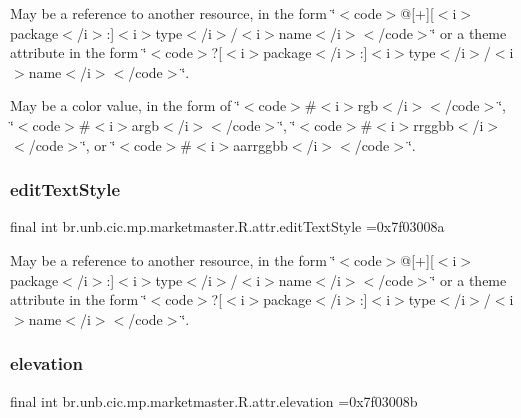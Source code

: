 May be a reference to another resource, in the form \char`\"{}$<$code$>$@\mbox{[}+\mbox{]}\mbox{[}$<$i$>$package$<$/i$>$\+:\mbox{]}$<$i$>$type$<$/i$>$/$<$i$>$name$<$/i$>$$<$/code$>$\char`\"{} or a theme attribute in the form \char`\"{}$<$code$>$?\mbox{[}$<$i$>$package$<$/i$>$\+:\mbox{]}$<$i$>$type$<$/i$>$/$<$i$>$name$<$/i$>$$<$/code$>$\char`\"{}. 

May be a color value, in the form of \char`\"{}$<$code$>$\#$<$i$>$rgb$<$/i$>$$<$/code$>$\char`\"{}, \char`\"{}$<$code$>$\#$<$i$>$argb$<$/i$>$$<$/code$>$\char`\"{}, \char`\"{}$<$code$>$\#$<$i$>$rrggbb$<$/i$>$$<$/code$>$\char`\"{}, or \char`\"{}$<$code$>$\#$<$i$>$aarrggbb$<$/i$>$$<$/code$>$\char`\"{}. \mbox{\label{classbr_1_1unb_1_1cic_1_1mp_1_1marketmaster_1_1R_1_1attr_a7110ab4707d14bd241a3efbdc67bd593}} 
\subsubsection{\texorpdfstring{edit\+Text\+Style}{editTextStyle}}
{\footnotesize\ttfamily final int br.\+unb.\+cic.\+mp.\+marketmaster.\+R.\+attr.\+edit\+Text\+Style =0x7f03008a\hspace{0.3cm}{\ttfamily [static]}}

May be a reference to another resource, in the form \char`\"{}$<$code$>$@\mbox{[}+\mbox{]}\mbox{[}$<$i$>$package$<$/i$>$\+:\mbox{]}$<$i$>$type$<$/i$>$/$<$i$>$name$<$/i$>$$<$/code$>$\char`\"{} or a theme attribute in the form \char`\"{}$<$code$>$?\mbox{[}$<$i$>$package$<$/i$>$\+:\mbox{]}$<$i$>$type$<$/i$>$/$<$i$>$name$<$/i$>$$<$/code$>$\char`\"{}. \mbox{\label{classbr_1_1unb_1_1cic_1_1mp_1_1marketmaster_1_1R_1_1attr_a7f7741adaa9fbcff1ef68ddb779062b7}} 
\subsubsection{\texorpdfstring{elevation}{elevation}}
{\footnotesize\ttfamily final int br.\+unb.\+cic.\+mp.\+marketmaster.\+R.\+attr.\+elevation =0x7f03008b\hspace{0.3cm}{\ttfamily [static]}}

